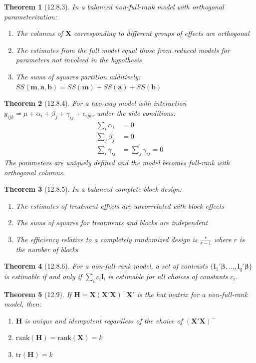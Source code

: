 \documentclass{article}
\newtheorem{theorem}{Theorem}[section]
\begin{document}
\begin{theorem}[12.8.3] 
In a balanced non-full-rank model with orthogonal parameterization:
\begin{enumerate}[label=(\roman*)]
\item The columns of $\mathbf{X}$ corresponding to different groups of effects are orthogonal
\item The estimates from the full model equal those from reduced models for parameters not involved in the hypothesis
\item The sums of squares partition additively: $SS(\mathbf{m},\mathbf{a},\mathbf{b}) = SS(\mathbf{m}) + SS(\mathbf{a}) + SS(\mathbf{b})$
\end{enumerate}
\end{theorem}

\begin{theorem}[12.8.4]
For a two-way model with interaction $y_{ijk} = \mu + \alpha_i + \beta_j + \gamma_{ij} + \epsilon_{ijk}$, under the side conditions:
\begin{align*}
\sum_i \alpha_i &= 0\\
\sum_j \beta_j &= 0\\
\sum_i \gamma_{ij} &= \sum_j \gamma_{ij} = 0
\end{align*}
The parameters are uniquely defined and the model becomes full-rank with orthogonal columns.
\end{theorem}

\begin{theorem}[12.8.5]
In a balanced complete block design:
\begin{enumerate}[label=(\roman*)]
\item The estimates of treatment effects are uncorrelated with block effects
\item The sums of squares for treatments and blocks are independent
\item The efficiency relative to a completely randomized design is $\frac{r}{r-1}$ where $r$ is the number of blocks
\end{enumerate}
\end{theorem}

\begin{theorem}[12.8.6]
For a non-full-rank model, a set of contrasts $\{\mathbf{l}_1'\boldsymbol{\beta}, \ldots, \mathbf{l}_q'\boldsymbol{\beta}\}$ is estimable if and only if $\sum_i c_i\mathbf{l}_i$ is estimable for all choices of constants $c_i$.
\end{theorem}


\begin{theorem}[12.9]
If $\mathbf{H} = \mathbf{X}(\mathbf{X}'\mathbf{X})^{-}\mathbf{X}'$ is the hat matrix for a non-full-rank model, then:
\begin{enumerate}[label=(\roman*)]
\item $\mathbf{H}$ is unique and idempotent regardless of the choice of $(\mathbf{X}'\mathbf{X})^{-}$
\item $\text{rank}(\mathbf{H}) = \text{rank}(\mathbf{X}) = k$
\item $\text{tr}(\mathbf{H}) = k$
\end{enumerate}
\end{theorem}
\end{document}
